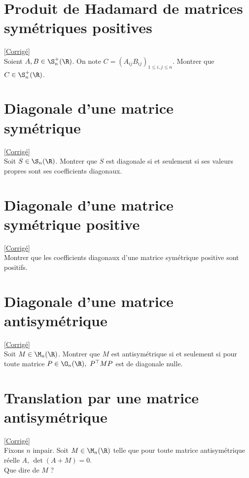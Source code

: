 \documentclass[8pt]{book}
\begin{document}
\section{Produit de Hadamard de matrices symétriques positives}
\label{Produit de Hadamard de matrices symétriques positives}
\textcolor{blue}{\hyperref[Produit de Hadamard de matrices symétriques positives corrigé]{[Corrigé]}}\\
Soient $A,B\in \S_n^+(\R)$. On note $C=(A_{ij}B_{ij})_{1\leq i,j\leq n}$. Montrer que $C\in \S_n^+(\R)$.

\section{Diagonale d'une matrice symétrique}
\label{Diagonale d'une matrice symétrique}
\textcolor{blue}{\hyperref[Diagonale d'une matrice symétrique corrigé]{[Corrigé]}}\\
Soit $S\in \S_n(\R)$. Montrer que $S$ est diagonale si et seulement si ses valeurs propres sont ses coefficients diagonaux.

\section{Diagonale d'une matrice symétrique positive}
\label{Diagonale d'une matrice symétrique positive}
\textcolor{blue}{\hyperref[Diagonale d'une matrice symétrique positive corrigé]{[Corrigé]}}\\
Montrer que les coefficients diagonaux d'une matrice symétrique positive sont positifs.

\section{Diagonale d'une matrice antisymétrique}
\label{Diagonale d'une matrice antisymétrique}
\textcolor{blue}{\hyperref[Diagonale d'une matrice antisymétrique corrigé]{[Corrigé]}}\\
Soit $M\in \M_n(\R)$. Montrer que $M$ est antisymétrique si et seulement si pour toute matrice $P\in \O_n(\R),\ P^\top MP$ est de diagonale nulle.

\section{Translation par une matrice antisymétrique }
\label{Translation par une matrice antisymétrique}
\textcolor{blue}{\hyperref[Translation par une matrice antisymétrique corrigé]{[Corrigé]}}\\
Fixons $n$ impair. Soit $M\in \M_n(\R)$ telle que pour toute matrice antisymétrique réelle $A$, $\det(A+M)=0$.\\
Que dire de $M$ ?
\end{document}
